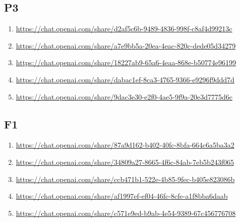 \subsection{P3\label{P3-1}}

\begin{enumerate}
    \item \href{https://chat.openai.com/share/d2af5c6b-9489-4836-998f-c8af4d99213c}{https://chat.openai.com/share/d2af5c6b-9489-4836-998f-c8af4d99213c}
    \item \href{https://chat.openai.com/share/a7e9bb5a-20ea-4eac-820c-dede05d34279}{https://chat.openai.com/share/a7e9bb5a-20ea-4eac-820c-dede05d34279}
    \item \href{https://chat.openai.com/share/18227ab9-65a6-4eaa-868e-b50774e96199}{https://chat.openai.com/share/18227ab9-65a6-4eaa-868e-b50774e96199}
    \item \href{https://chat.openai.com/share/dabac1ef-8ca3-4765-9366-e9296f9ddd7d}{https://chat.openai.com/share/dabac1ef-8ca3-4765-9366-e9296f9ddd7d}
    \item \href{https://chat.openai.com/share/9dac3e30-e2f0-4ae5-9f9a-20e3d7775d6c}{https://chat.openai.com/share/9dac3e30-e2f0-4ae5-9f9a-20e3d7775d6c}
\end{enumerate}

\subsection{F1\label{F1-1}}

\begin{enumerate}
    \item \href{https://chat.openai.com/share/87a9d162-b402-40fc-8bfa-664c6a5ba3a2}{https://chat.openai.com/share/87a9d162-b402-40fc-8bfa-664c6a5ba3a2}
    \item \href{https://chat.openai.com/share/34809a27-8665-4f6c-84ab-7eb5b243f065}{https://chat.openai.com/share/34809a27-8665-4f6c-84ab-7eb5b243f065}
    \item \href{https://chat.openai.com/share/ccb471b1-522e-4b85-9fec-b405e823086b}{https://chat.openai.com/share/ccb471b1-522e-4b85-9fec-b405e823086b}
    \item \href{https://chat.openai.com/share/af1997ef-ef04-46fc-8cfe-a1f8bba6daab}{https://chat.openai.com/share/af1997ef-ef04-46fc-8cfe-a1f8bba6daab}
    \item \href{https://chat.openai.com/share/c571e9ed-b9ab-4e54-9389-67c456776708}{https://chat.openai.com/share/c571e9ed-b9ab-4e54-9389-67c456776708}
\end{enumerate}

